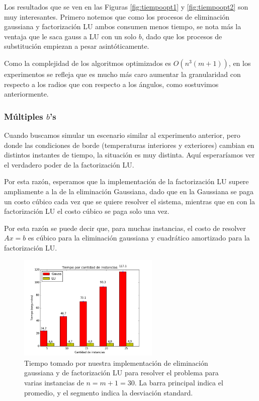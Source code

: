 Los resultados que se ven en las Figuras \ref{fig:tiempoopt1} y \ref{fig:tiempoopt2} son muy interesantes. Primero notemos que como los procesos de eliminación gaussiana y factorización LU ambos consumen menos tiempo, se nota más la ventaja que le saca gauss a LU con un solo $b$, dado que los procesos de substitución empiezan a pesar asintóticamente.


Como la complejidad de los algoritmos optimizados es $O(n^3(m+1))$, en los experimentos se refleja que es mucho más caro aumentar la granularidad con respecto a los radios que con respecto a los ángulos, como sostuvimos anteriormente.

\subsubsection{Múltiples $b$'s}

Cuando buscamos simular un escenario similar al experimento anterior, pero donde las condiciones de borde (temperaturas interiores y exteriores) cambian en distintos instantes de tiempo, la situación es muy distinta. Aquí esperaríamos ver el verdadero poder de la factorización LU.

Por esta razón, esperamos que la implementación de la factorización LU supere ampliamente a la de la eliminación Gaussiana, dado que en la Gaussiana se paga un costo cúbico cada vez que se quiere resolver el sistema, mientras que en con la factorización LU el costo cúbico se paga solo una vez.

Por esta razón se puede decir que, para muchas instancias, el costo de resolver $Ax = b$ es cúbico para la eliminación gaussiana y cuadrático amortizado para la factorización LU.

\begin{figure}[H]
\centering  
 \includegraphics[width=0.6\textwidth]{imgs/tiempos_ninst.png}
 \caption{\footnotesize{Tiempo tomado por nuestra implementación de eliminación gaussiana y de factorización LU para resolver el problema para varias instancias de $n = m+1 = 30$. La barra principal indica el promedio, y el segmento indica la desviación standard.}}
\label{fig:tiemponinst}
\end{figure}


